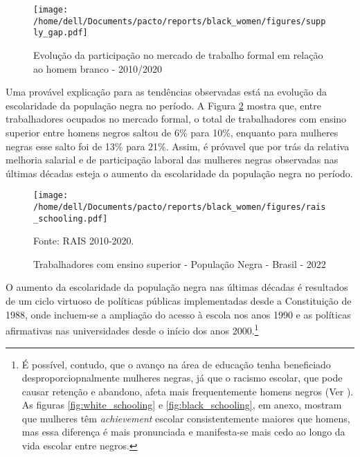 \documentclass[12pt]{article}
\begin{document}
\begin{figure}[H]
    \centering
    \caption{Evolução da participação no mercado de trabalho formal em relação ao homem branco - 2010/2020}
        \texttt{[image: /home/dell/Documents/pacto/reports/black\_women/figures/supply\_gap.pdf]}
    \label{fig:supply_gap}
\end{figure}

\par Uma provável explicação para as tendências observadas está na evolução da escolaridade da população negra no período. A Figura \ref{fig:rais_schooling} mostra que, entre trabalhadores ocupados no mercado formal, o total de trabalhadores com ensino superior entre homens negros saltou de 6\% para 10\%, enquanto para mulheres negras esse salto foi de 13\% para 21\%. Assim, é próvavel que por trás da relativa melhoria salarial e de participação laboral das mulheres negras observadas nas últimas décadas esteja o aumento da escolaridade da população negra no período.

% 
% 

\begin{figure}[H]
    \centering
    \caption{Trabalhadores com ensino superior - População Negra - Brasil - 2022}
        \texttt{[image: /home/dell/Documents/pacto/reports/black\_women/figures/rais\_schooling.pdf]}
    \label{fig:rais_schooling}
    \begin{floatnotes}
        \item[Fonte:] RAIS 2010-2020.
    \end{floatnotes}
\end{figure}

\par O aumento da escolaridade da população negra nas últimas décadas é resultados de um ciclo virtuoso de políticas públicas implementadas desde a Constituição de 1988, onde incluem-se a ampliação do acesso à escola nos anos 1990 e as políticas afirmativas nas universidades desde o início dos anos 2000.\footnote{É possível, contudo, que o avanço na área de educação tenha beneficiado desproporciopnalmente mulheres negras, já que o racismo escolar, que pode causar retenção e abandono, afeta mais frequentemente homens negros (Ver \autocite{carvalho2004fracasso}). As figuras \ref{fig:white_schooling} e \ref{fig:black_schooling}, em anexo, mostram que mulheres têm \textit{achievement} escolar consistentemente maiores que homens, mas essa diferença é mais pronunciada e manifesta-se mais cedo ao longo da vida escolar entre negros.}
\end{document}
